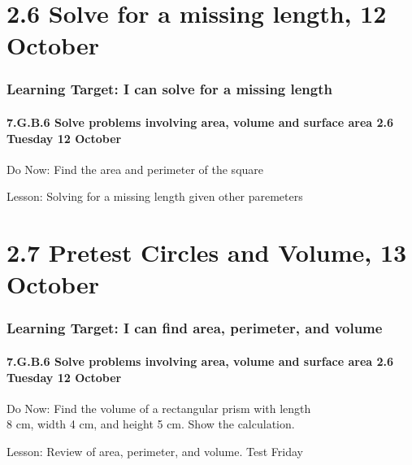 \documentclass{beamer}
\begin{document}
\section{2.6 Solve for a missing length, 12 October}
\frame
{
  \frametitle{Learning Target: I can solve for a missing length}
  \framesubtitle{7.G.B.6 Solve problems involving area, volume and surface area \hfill \alert{2.6 Tuesday 12 October}}
  \begin{block}{Do Now: Find the area and perimeter of the square}
    \begin{flushleft}
    \end{flushleft}
\end{block}
  Lesson: Solving for a missing length given other paremeters
} 

\section{2.7 Pretest Circles and Volume, 13 October}
\frame
{
  \frametitle{Learning Target: I can find area, perimeter, and volume}
  \framesubtitle{7.G.B.6 Solve problems involving area, volume and surface area \hfill \alert{2.6 Tuesday 12 October}}
  \begin{block}{Do Now: Find the volume of a rectangular prism with length \\8 cm, width 4 cm, and height 5 cm. Show the calculation.}
    \begin{flushright}
      \end{flushright}
\end{block}
  Lesson: Review of area, perimeter, and volume. \alert{Test Friday}
} 
\end{document}
